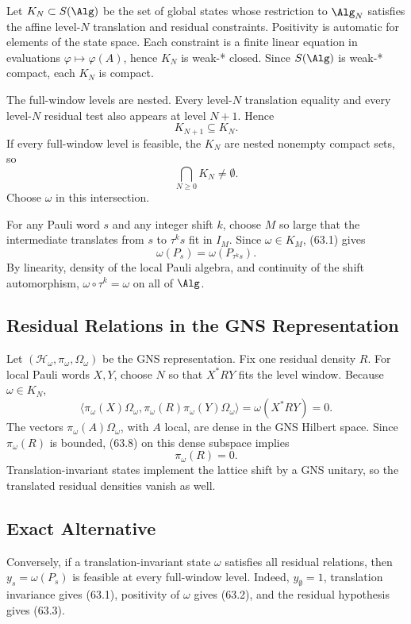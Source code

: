 Let \(K_N\subset S(\Alg)\) be the set of global states whose restriction
to \(\Alg_N\) satisfies the affine level-\(N\) translation and residual
constraints.  Positivity is automatic for elements of the state space.  Each
constraint is a finite linear equation in evaluations
\(\varphi\mapsto\varphi(A)\), hence \(K_N\) is weak-* closed.  Since
\(S(\Alg)\) is weak-* compact, each \(K_N\) is compact.

The full-window levels are nested.  Every level-\(N\) translation equality and
every level-\(N\) residual test also appears at level \(N+1\).  Hence
\[
  K_{N+1}\subseteq K_N.
  \tag{63.6}
\]
If every full-window level is feasible, the \(K_N\) are nested nonempty compact
sets, so
\[
  \bigcap_{N\ge0}K_N\neq\emptyset.
  \tag{63.7}
\]
Choose \(\omega\) in this intersection.

For any Pauli word \(s\) and any integer shift \(k\), choose \(M\) so large
that the intermediate translates from \(s\) to \(\tau^k s\) fit in \(I_M\).
Since \(\omega\in K_M\), (63.1) gives
\[
  \omega(P_s)=\omega(P_{\tau^k s}).
\]
By linearity, density of the local Pauli algebra, and continuity of the shift
automorphism, \(\omega\circ\tau^k=\omega\) on all of \(\Alg\).

\subsection{Residual Relations in the GNS Representation}

Let \((\mathcal H_\omega,\pi_\omega,\Omega_\omega)\) be the GNS
representation.  Fix one residual density \(R\).  For local Pauli words
\(X,Y\), choose \(N\) so that \(X^*RY\) fits the level window.  Because
\(\omega\in K_N\),
\[
  \langle \pi_\omega(X)\Omega_\omega,
          \pi_\omega(R)\pi_\omega(Y)\Omega_\omega\rangle
  =
  \omega(X^*RY)
  =
  0.
  \tag{63.8}
\]
The vectors \(\pi_\omega(A)\Omega_\omega\), with \(A\) local, are dense in the
GNS Hilbert space.  Since \(\pi_\omega(R)\) is bounded, (63.8) on this dense
subspace implies
\[
  \pi_\omega(R)=0.
  \tag{63.9}
\]
Translation-invariant states implement the lattice shift by a GNS unitary, so
the translated residual densities vanish as well.

\subsection{Exact Alternative}

Conversely, if a translation-invariant state \(\omega\) satisfies all residual
relations, then \(y_s=\omega(P_s)\) is feasible at every full-window level.
Indeed, \(y_\emptyset=1\), translation invariance gives (63.1), positivity of
\(\omega\) gives (63.2), and the residual hypothesis gives (63.3).


